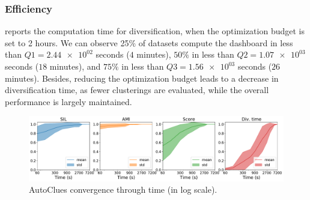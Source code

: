 \vspace{-0.5cm}
\subsubsection{Efficiency}\label{sssec:efficiency}
 reports the computation time for diversification, when the optimization budget is set to 2 hours.
We can observe 25\% of datasets compute the dashboard in less than $Q1=\num{2.44e02}$ seconds ($4$ minutes), $50\%$ in less than $Q2=\num{1.07e03}$ seconds ($18$ minutes), and $75\%$ in less than $Q3=\num{1.56e03}$ seconds ($26$ minutes).
Besides, reducing the optimization budget leads to a decrease in diversification time, as fewer clusterings are evaluated, while the overall performance is largely maintained.

\begin{figure}[t]
    \centering
    \includegraphics[scale=.3]{chapters/data-centric/unsupervised/img/all.pdf}
    \caption{AutoClues convergence through time (in log scale).}
    \label{clustering-fig:convergence}
\end{figure}

